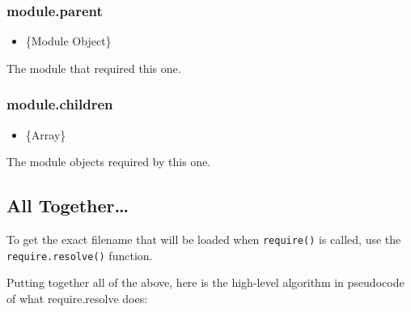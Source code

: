 \subsubsection{module.parent}

\begin{itemize}
\item
  \{Module Object\}
\end{itemize}

The module that required this one.

\subsubsection{module.children}

\begin{itemize}
\item
  \{Array\}
\end{itemize}

The module objects required by this one.

\subsection{All Together\ldots{}}

To get the exact filename that will be loaded when \texttt{require()} is
called, use the \texttt{require.resolve()} function.

Putting together all of the above, here is the high-level algorithm in
pseudocode of what require.resolve does:

